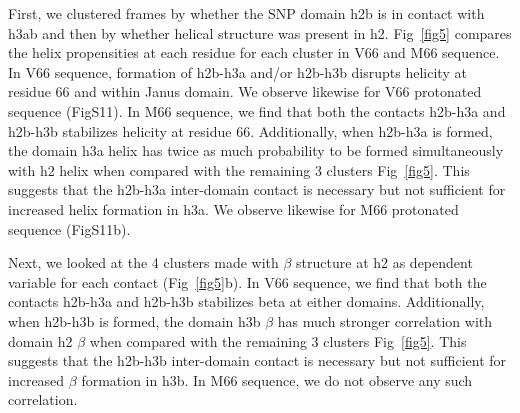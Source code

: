\documentclass[journal=jacsat,manuscript=article]{achemso}
\begin{document}
First, we clustered frames by whether the SNP domain h2b is in contact with h3ab and then by whether helical structure was present in h2. Fig~\ref{fig5} compares the helix propensities at each residue for each cluster in V66 and M66 sequence. In V66 sequence, formation of h2b-h3a and/or h2b-h3b disrupts helicity at residue 66 and within Janus domain. We observe likewise for V66 protonated sequence (FigS11). In M66 sequence, we find that both the contacts h2b-h3a and h2b-h3b stabilizes helicity at residue 66. Additionally, when h2b-h3a is formed, the domain h3a helix has twice as much probability to be formed simultaneously with h2 helix when compared with the remaining 3 clusters Fig~\ref{fig5}. This suggests that the h2b-h3a inter-domain contact is necessary but not sufficient for increased helix formation in h3a. We observe likewise for M66 protonated sequence (FigS11b). 

Next, we looked at the 4 clusters made with $\beta$ structure at h2 as dependent variable for each contact (Fig~\ref{fig5}b). In V66 sequence, we find that both the contacts h2b-h3a and h2b-h3b stabilizes beta at either domains. Additionally,  when h2b-h3b is formed,  the domain h3b $\beta$ has much stronger correlation with domain h2 $\beta$ when compared with the remaining 3 clusters Fig~\ref{fig5}. This suggests that the h2b-h3b inter-domain contact is necessary but not sufficient for increased $\beta$ formation in h3b. In M66 sequence, we do not observe any such correlation.
\end{document}
